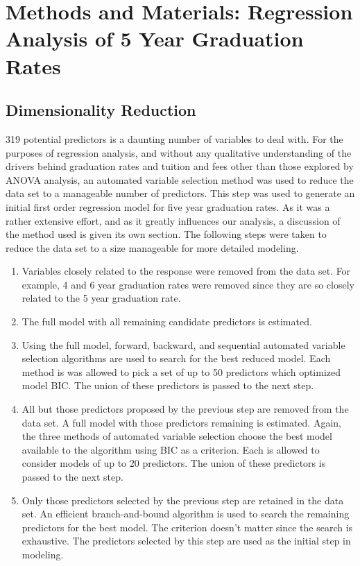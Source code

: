 \documentclass{article}
\begin{document}
\section{Methods and Materials:  Regression Analysis of 5 Year Graduation Rates}

\subsection{Dimensionality Reduction}

319 potential predictors is a daunting number of variables to deal with. For the purposes of regression analysis, and without any qualitative understanding of the drivers behind graduation rates and tuition and fees other than those explored by ANOVA analysis, an automated variable selection method was used to reduce the data set to a manageable number of predictors. This step was used to generate an initial first order regression model for five year graduation rates. As it was a rather extensive effort, and as it greatly influences our analysis, a discussion of the method used is given its own section. The following steps were taken to reduce the data set to a size manageable for more detailed modeling.

\begin{enumerate}[1)]
\item{} Variables closely related to the response were removed from the data set. For example, 4 and 6 year graduation rates were removed since they are so closely related to the 5 year graduation rate.
\item{} The full model with all remaining candidate predictors is estimated.
\item{} Using the full model, forward, backward, and sequential automated variable selection algorithms are used to search for the best reduced model. Each method is was allowed to pick a set of up to 50 predictors which optimized model BIC. The union of these predictors is passed to the next step.
\item{} All but those predictors proposed by the previous step are removed from the data set. A full model with those predictors remaining is estimated. Again, the three methods of automated variable selection choose the best model available to the algorithm using BIC as a criterion. Each is allowed to consider models of up to 20 predictors. The union of these predictors is passed to the next step.
\item{} Only those predictors selected by the previous step are retained in the data set. An efficient branch-and-bound algorithm is used to search the remaining predictors for the best model. The criterion doesn't matter since the search is exhaustive. The predictors selected by this step are used as the initial step in modeling.
\end{enumerate}
\end{document}
